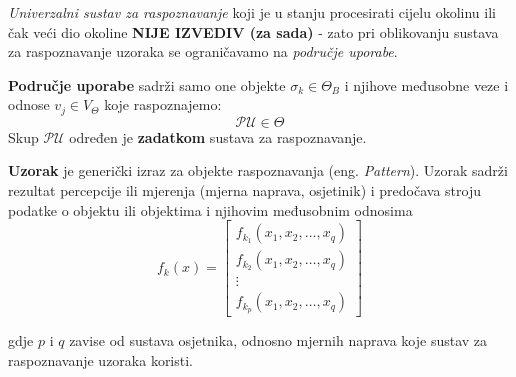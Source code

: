 \documentclass{book}
\begin{document}
 \textit{Univerzalni sustav za raspoznavanje} koji je u stanju
procesirati cijelu okolinu ili čak  veći dio okoline \textbf{NIJE IZVEDIV (za
sada)} - zato pri oblikovanju sustava za raspoznavanje uzoraka se ograničavamo
na \textit{područje uporabe}. \\ 
\newpage 

\textbf{ Područje uporabe } sadrži
samo one objekte $ \sigma_k \in \Theta_B $ i njihove  međusobne veze i odnose
$v_j \in V_\Theta $ koje raspoznajemo: $$ \mathcal{PU} \in \Theta $$
Skup $\mathcal{PU}$ određen je \textbf{zadatkom} sustava za raspoznavanje. \\


 \textbf{Uzorak } je generički izraz za objekte  raspoznavanja
(eng. \textit{Pattern}).  Uzorak sadrži rezultat percepcije ili mjerenja (mjerna
naprava, osjetinik) i  predočava stroju podatke o objektu ili objektima i
njihovim međusobnim odnosima $$ f_k(x) = \begin{bmatrix} 
f_{k_1}(x_1, x_2, \ldots, x_q) \\
f_{k_2}(x_1, x_2, \ldots, x_q) \\
\vdots \\
f_{k_p}(x_1, x_2, \ldots , x_q)
\end{bmatrix} $$ 

gdje $p$ i $q$ zavise od sustava osjetnika, odnosno mjernih naprava koje sustav
za raspoznavanje uzoraka koristi. \\
\end{document}
